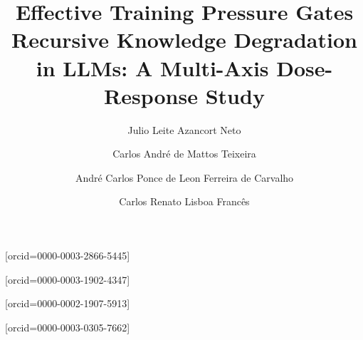 \documentclass[a4paper,fleqn]{cas-dc}
\begin{document}
\let\WriteBookmarks\relax

\setlength{\textfloatsep}{6pt plus 2pt minus 2pt}
\setlength{\floatsep}{6pt plus 2pt minus 2pt}
\setlength{\intextsep}{6pt plus 2pt minus 2pt}
\setlength{\dbltextfloatsep}{6pt plus 2pt minus 2pt}
\setlength{\dblfloatsep}{6pt plus 2pt minus 2pt}
\setlength{\abovecaptionskip}{3pt}
\setlength{\belowcaptionskip}{1pt}


\title[mode=title]{Effective Training Pressure Gates Recursive Knowledge
  Degradation in LLMs: A Multi-Axis Dose-Response Study}










\author[1]{Julio Leite Azancort Neto}[orcid=0000-0003-2866-5445]

\author[1,2]{Carlos André de Mattos Teixeira}[orcid=0000-0003-1902-4347]

\author[3]{André Carlos Ponce de Leon Ferreira de Carvalho}[orcid=0000-0002-1907-5913]

\author[1]{Carlos Renato Lisboa Francês}[orcid=0000-0003-0305-7662]

\address[1]{Instituto de Tecnologia, Universidade Federal do Pará (UFPA),
  Belém, PA, Brazil}
\address[2]{Amazon Sustainability Institute with Science and Innovation (iSACI),
  Belém, PA, Brazil}
\address[3]{Instituto de Ciências Matemáticas e de Computação (ICMC),
  Universidade de São Paulo (USP), São Carlos, SP, Brazil}
\end{document}
